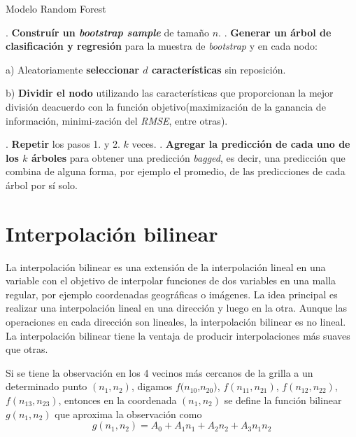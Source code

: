 \begin{algorithm}[h]
    \caption{Modelo Random Forest}

    \begin{algorithmic}
            . \textbf{Construír un \textit{bootstrap sample}} de tamaño $n$.
            . \textbf{Generar un árbol de clasificación y regresión} para la muestra de \textit{bootstrap} y en cada nodo:

            \INDSTATE a) Aleatoriamente \textbf{seleccionar $d$ características} sin reposición.

            \INDSTATE b) \textbf{Dividir el nodo} utilizando las características que proporcionan la mejor división de\INDSTATE acuerdo con la función objetivo(maximización de la ganancia de información, minimi-\INDSTATE zación del \textit{RMSE}, entre otras).
            
            . \textbf{Repetir} los pasos 1. y 2. $k$ veces.
            . \textbf{Agregar la predicción de cada uno de los $k$ árboles} para obtener una predicción \textit{bagged}, es decir, una predicción que combina de alguna forma, por ejemplo el promedio, 
            de las predicciones de cada árbol por sí solo.
    \end{algorithmic}
\end{algorithm}



%
%
%
%
\section{Interpolación bilinear}
La interpolación bilinear es una extensión de la interpolación lineal en una variable con el objetivo de interpolar funciones de dos variables en una malla regular, por ejemplo coordenadas geográficas o imágenes.
La idea principal es realizar una interpolación lineal en una dirección y luego en la otra. Aunque las operaciones en cada dirección son lineales, la interpolación bilinear es no lineal. La interpolación bilinear tiene la ventaja de producir interpolaciones más suaves que otras. 

Si se tiene la observación en los 4 vecinos más cercanos de la grilla a un determinado punto $(n_1, n_2)$, digamos 
$f(n_{10}$,$n_{20})$, $f(n_{11},n_{21})$, $f(n_{12},n_{22})$, $f(n_{13},n_{23})$, entonces en la coordenada $(n_1, n_2)$ se define la 
función bilinear $g(n_1, n_2)$ que aproxima la observación como
\begin{equation}
    g(n_1, n_2) = A_0 + A_1 n_1 + A_2n_2 + A_3n_1n_2
\end{equation}

